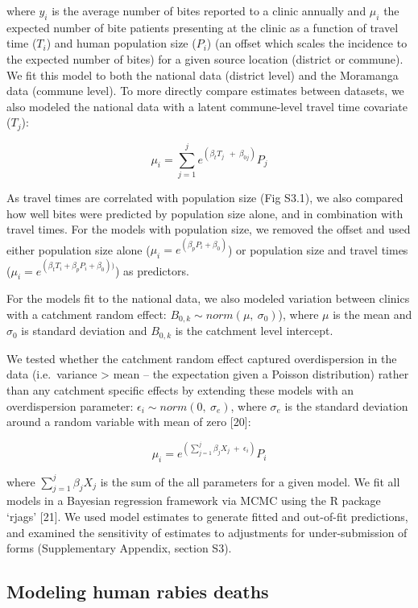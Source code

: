 \documentclass[
  oneside]{book}
\begin{document}
where \(y_{i}\) is the average number of bites reported to a clinic
annually and \(\mu_{i}\) the expected number of bite patients presenting
at the clinic as a function of travel time (\(T_{i}\)) and human
population size (\(P_{i}\)) (an offset which scales the incidence to the
expected number of bites) for a given source location (district or
commune). We fit this model to both the national data (district level)
and the Moramanga data (commune level). To more directly compare
estimates between datasets, we also modeled the national data with a
latent commune-level travel time covariate (\(T_{j}\)):

\[\mu_{i} = \sum_{j = 1}^{j}e^{(\beta_{t}T_{j}\ \  + \ \beta_{0j})}P_{j}\]

As travel times are correlated with population size (Fig S3.1), we also
compared how well bites were predicted by population size alone, and in
combination with travel times. For the models with population size, we
removed the offset and used either population size alone
(\(\mu_{i} = e^{(\beta_{p}P_{i} + \beta_{0})}\)) or population size and
travel times
(\(\mu_{i} = e^{(\beta_{t}T_{i} + \beta_{p}P_{i} + \beta_{0}))}\)) as
predictors.

For the models fit to the national data, we also modeled variation
between clinics with a catchment random effect:
\(B_{0,k} \sim norm(\mu,\ \sigma_{0})\)), where \(\mu\) is the mean and
\(\sigma_{0}\) is standard deviation and \(B_{0,k}\) is the catchment level
intercept.

We tested whether the catchment random effect captured overdispersion in
the data (i.e.~variance \textgreater{} mean -- the expectation given a Poisson
distribution) rather than any catchment specific effects by extending
these models with an overdispersion parameter:
\(\epsilon_{i} \sim norm(0,\ \sigma_{e})\), where \(\sigma_{e}\) is the
standard deviation around a random variable with mean of zero {[}20{]}:

\[\mu_{i} = e^{(\sum_{j = 1}^{j}\beta_{j}X_{j}\  + \ \epsilon_{i})}P_{i}\]

where \(\sum_{j = 1}^{j}\beta_{j}X_{j}\) is the sum of the all parameters
for a given model. We fit all models in a Bayesian regression framework
via MCMC using the R package `rjags' {[}21{]}. We used model estimates to
generate fitted and out-of-fit predictions, and examined the sensitivity
of estimates to adjustments for under-submission of forms (Supplementary
Appendix, section S3).

\hypertarget{modeling-human-rabies-deaths}{%
\subsection{Modeling human rabies deaths}\label{modeling-human-rabies-deaths}}
\end{document}
